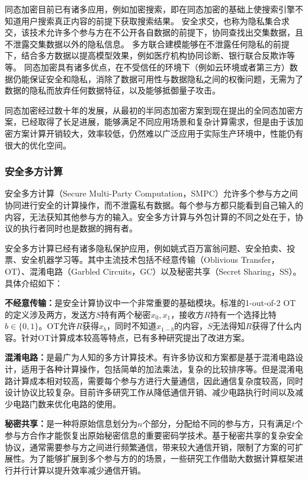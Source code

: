 同态加密目前已有诸多应用，例如加密搜索，即在同态加密的基础上使搜索引擎不知道用户搜索真正内容的前提下获取搜索结果。
安全求交，也称为隐私集合求交，该技术允许多个参与方在不公开各自数据的前提下，协同查找出交集数据，且不泄露交集数据以外的隐私信息。
多方联合建模能够在不泄露任何隐私的前提下，结合多方数据以提高模型效果，例如医疗机构协同诊断、银行联合反欺诈等等。
同态加密具有诸多优点，在不受信任的环境下（例如云环境或者第三方）数据仍能保证安全和隐私，消除了数据可用性与数据隐私之间的权衡问题，无需为了数据的隐私而放弃任何数据特征，以及能够抵御量子攻击。

同态加密经过数十年的发展，从最初的半同态加密方案到现在提出的全同态加密方案，已经取得了长足进展，能够满足不同应用场景和复杂计算需求，但是由于该加密方案计算开销较大，效率较低，仍然难以广泛应用于实际生产环境中，性能仍有很大的优化空间。

\subsubsection{安全多方计算}
安全多方计算（Secure Multi-Party Computation，SMPC）允许多个参与方之间协同进行安全的计算操作，而不泄露私有数据。每个参与方都只能看到自己输入的内容，无法获知其他参与方的输入。安全多方计算与外包计算的不同之处在于，协议的执行者同时也是数据的拥有者\cite{2018A}。

安全多方计算已经有诸多隐私保护应用，例如姚式百万富翁问题\cite{1982Protocols}、安全拍卖、投票、安全机器学习\cite{2017Oblivious}等。其中主流技术包括不经意传输（Oblivious Transfer，OT）、混淆电路（Garbled Circuits，GC）以及秘密共享（Secret Sharing，SS）。具体介绍如下：
\begin{compactitem}
	\item \textbf{不经意传输：}是安全计算协议中一个非常重要的基础模块。标准的1-out-of-2 OT的定义涉及两方，发送方$ S $持有两个秘密$ x_0,x_1$，接收方$ R $持有一个选择比特$ b\in\{0,1\} $。OT允许$ R $获得$ x_b $，同时不知道$ x_{1-b} $的内容，$ S $无法得知$ R $获得了什么内容。针对OT计算成本较高等特点，已有多种研究提出了改进方案。
	\item \textbf{混淆电路：}是最广为人知的多方计算技术。有许多协议和方案都是基于混淆电路设计，适用于各种计算操作，包括简单的加法乘法，复杂的比较排序等。但是混淆电路计算成本相对较高，需要每个参与方进行大量通信，因此通信复杂度较高，同时设计协议比较复杂。目前许多研究工作从降低通信开销\cite{goyal2008efficient}、减少电路执行时间\cite{malkhi2004fairplay}以及减少电路门数\cite{pinkas2009secure}来优化电路的使用。
	\item \textbf{秘密共享：}是一种将原始信息划分为$n$个部分，分配给不同的参与方，只有满足$t$个参与方合作才能恢复出原始秘密信息的重要密码学技术。基于秘密共享的复杂安全协议，通常需要参与方之间进行频繁通信，带来较大通信开销，限制了方案的可扩展性。为了能够扩展到多个参与方的的场景，一些研究工作借助大数据计算框架进行并行计算以提升效率减少通信开销。
\end{compactitem}

